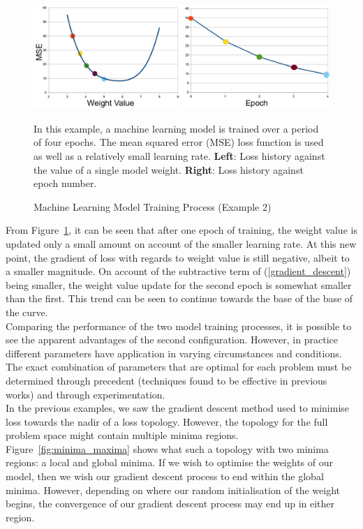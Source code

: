\begin{figure}[h]
	\centering
	\includegraphics[scale=0.35]{Figures/gradientDescent_mse_smallLR.jpg}
	\caption{Machine Learning Model Training Process (Example 2)} {In this example, a machine learning model is trained over a period of four epochs. The mean squared error (MSE) loss function is used as well as a relatively small learning rate. \textbf{Left}: Loss history against the value of a single model weight.  \textbf{Right}: Loss history against epoch number.}
	\label{fig:GD_mseSmallLR}
\end{figure}

\noindent
From Figure~\ref{fig:GD_mseSmallLR}, it can be seen that after one epoch of training, the weight value is updated only a small amount on account of the smaller learning rate. At this new point, the gradient of loss with regards to weight value is still negative, albeit to a smaller magnitude. On account of the subtractive term of (\ref{gradient_descent}) being smaller, the weight value update for the second epoch is somewhat smaller than the first. This trend can be seen to continue towards the base of the base of the curve. \\

\noindent
Comparing the performance of the two model training processes, it is possible to see the apparent advantages of the second configuration.  However, in practice different parameters have application in varying circumstances and conditions. The exact combination of parameters that are optimal for each problem must be determined through precedent (techniques found to be effective in previous works) and through experimentation.  \\

\noindent
In the previous examples, we saw the gradient descent method used to minimise loss towards the nadir of a loss topology. However, the topology for the full problem space might contain multiple minima regions. Figure~\ref{fig:minima_maxima} shows what such a topology with two minima regions: a local and global minima. If we wish to optimise the weights of our model, then we wish our gradient descent process to end within the global minima. However, depending on where our random initialisation of the weight begins, the convergence of our gradient descent process may end up in either region. \\

